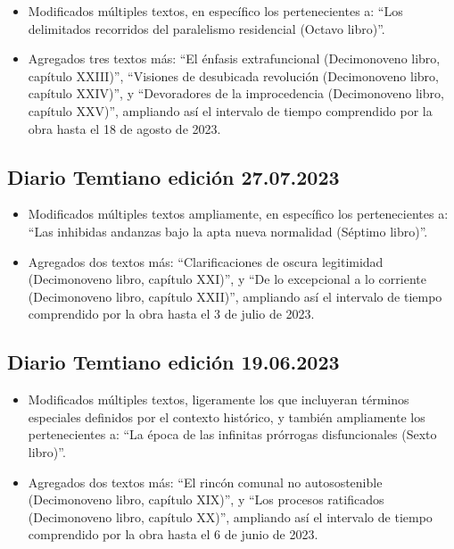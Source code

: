 \documentclass[
]{book}
\begin{document}
\begin{itemize}
\item
  Modificados múltiples textos, en específico los pertenecientes a: ``Los delimitados recorridos del paralelismo residencial (Octavo libro)''.
\item
  Agregados tres textos más: ``El énfasis extrafuncional (Decimonoveno libro, capítulo XXIII)'', ``Visiones de desubicada revolución (Decimonoveno libro, capítulo XXIV)'', y ``Devoradores de la improcedencia (Decimonoveno libro, capítulo XXV)'', ampliando así el intervalo de tiempo comprendido por la obra hasta el 18 de agosto de 2023.
\end{itemize}

\hypertarget{diario-temtiano-ediciuxf3n-27.07.2023}{%
\subsection*{Diario Temtiano edición 27.07.2023}\label{diario-temtiano-ediciuxf3n-27.07.2023}}

\begin{itemize}
\item
  Modificados múltiples textos ampliamente, en específico los pertenecientes a: ``Las inhibidas andanzas bajo la apta nueva normalidad (Séptimo libro)''.
\item
  Agregados dos textos más: ``Clarificaciones de oscura legitimidad (Decimonoveno libro, capítulo XXI)'', y ``De lo excepcional a lo corriente (Decimonoveno libro, capítulo XXII)'', ampliando así el intervalo de tiempo comprendido por la obra hasta el 3 de julio de 2023.
\end{itemize}

\hypertarget{diario-temtiano-ediciuxf3n-19.06.2023}{%
\subsection*{Diario Temtiano edición 19.06.2023}\label{diario-temtiano-ediciuxf3n-19.06.2023}}

\begin{itemize}
\item
  Modificados múltiples textos, ligeramente los que incluyeran términos especiales definidos por el contexto histórico, y también ampliamente los pertenecientes a: ``La época de las infinitas prórrogas disfuncionales (Sexto libro)''.
\item
  Agregados dos textos más: ``El rincón comunal no autosostenible (Decimonoveno libro, capítulo XIX)'', y ``Los procesos ratificados (Decimonoveno libro, capítulo XX)'', ampliando así el intervalo de tiempo comprendido por la obra hasta el 6 de junio de 2023.
\end{itemize}
\end{document}
